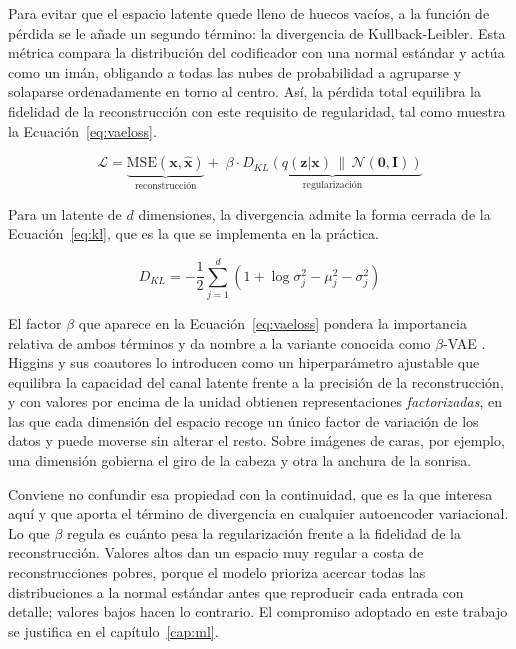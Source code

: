 Para evitar que el espacio latente quede lleno de huecos vacíos, a la
función de pérdida se le añade un segundo término: la divergencia de
Kullback-Leibler. Esta métrica compara la distribución del codificador
con una normal estándar y actúa como un imán, obligando a todas las
nubes de probabilidad a agruparse y solaparse ordenadamente en torno
al centro. Así, la pérdida total equilibra la fidelidad de la
reconstrucción con este requisito de regularidad, tal como muestra la
Ecuación~\eqref{eq:vaeloss}.

\begin{equation}
\label{eq:vaeloss}
\mathcal{L} = \underbrace{\mathrm{MSE}(\mathbf{x}, \hat{\mathbf{x}})}_{\text{reconstrucción}}
+ \; \beta \cdot \underbrace{D_{KL}\!\left( q(\mathbf{z}|\mathbf{x}) \,\|\, \mathcal{N}(\mathbf{0},\mathbf{I}) \right)}_{\text{regularización}}
\end{equation}

Para un latente de $d$ dimensiones, la divergencia admite la forma cerrada de la
Ecuación~\eqref{eq:kl}, que es la que se implementa en la práctica.

\begin{equation}
\label{eq:kl}
D_{KL} = -\frac{1}{2} \sum_{j=1}^{d} \left( 1 + \log \sigma_j^2 - \mu_j^2 - \sigma_j^2 \right)
\end{equation}

El factor $\beta$ que aparece en la Ecuación~\eqref{eq:vaeloss} pondera la
importancia relativa de ambos términos y da nombre a la variante conocida como
$\beta$-VAE \cite{Higgins2017}. Higgins y sus coautores lo introducen como un
hiperparámetro ajustable que equilibra la capacidad del canal latente frente a la
precisión de la reconstrucción, y con valores por encima de la unidad obtienen
representaciones \emph{factorizadas}, en las que cada dimensión del espacio
recoge un único factor de variación de los datos y puede moverse sin alterar el
resto. Sobre imágenes de caras, por ejemplo, una dimensión gobierna el giro de la
cabeza y otra la anchura de la sonrisa.

Conviene no confundir esa propiedad con la continuidad, que es la que interesa
aquí y que aporta el término de divergencia en cualquier autoencoder variacional.
Lo que $\beta$ regula es cuánto pesa la regularización frente a la fidelidad de la
reconstrucción. Valores altos dan un espacio muy regular a costa de
reconstrucciones pobres, porque el modelo prioriza acercar todas las
distribuciones a la normal estándar antes que reproducir cada entrada con
detalle; valores bajos hacen lo contrario. El compromiso adoptado en este trabajo
se justifica en el capítulo~\ref{cap:ml}.

